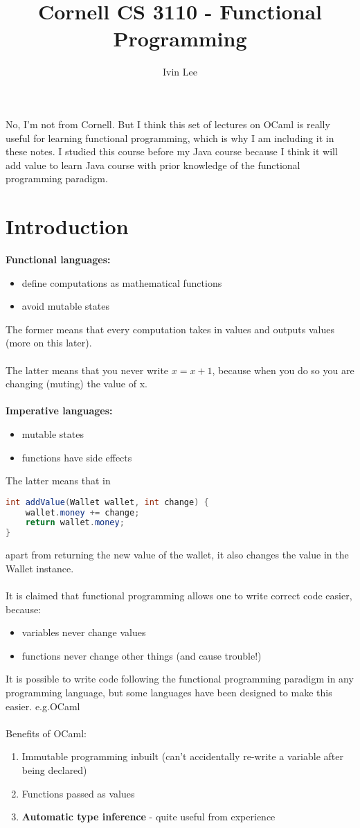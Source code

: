 \documentclass[12pt,a4paper]{article} %
\author{Ivin Lee}
\title{Cornell CS 3110 - Functional Programming}
\begin{document}
\maketitle
No, I'm not from Cornell. But I think this set of lectures on OCaml is really useful for learning functional programming, which is why I am including it in these notes. I studied this course before my Java course because I think it will add value to learn Java course with prior knowledge of the functional programming paradigm.
\section{Introduction}
\textbf{Functional languages: }
\begin{itemize}
	\item define computations as mathematical functions
	\item avoid mutable states
\end{itemize}
The former means that every computation takes in values and outputs values (more on this later).
\\\\
The latter means that you never write $x = x + 1$, because when you do so you are changing (muting) the value of x.
\\\\
\textbf{Imperative languages:}
\begin{itemize}
	\item mutable states
	\item functions have side effects
\end{itemize}
The latter means that in
\begin{lstlisting}[language = Java]
int addValue(Wallet wallet, int change) {
	wallet.money += change;
	return wallet.money;
}
\end{lstlisting}
apart from returning the new value of the wallet, it also changes the value in the Wallet instance.
\\\\
It is claimed that functional programming allows one to write correct code easier, because:
\begin{itemize}
	\item variables never change values
	\item functions never change other things (and cause trouble!)
\end{itemize}
It is possible to write code following the functional programming paradigm in any programming language, but some languages have been designed to make this easier. e.g.OCaml
\\\\
Benefits of OCaml:
\begin{enumerate}
	\item Immutable programming inbuilt (can't accidentally re-write a variable after being declared)
	\item Functions passed as values
	\item \textbf{Automatic type inference} - quite useful from experience
\end{enumerate}
\end{document}
